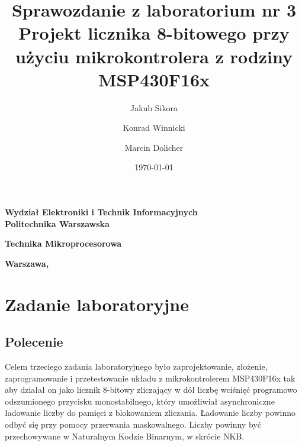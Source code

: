 \documentclass[a4paper,titlepage,11pt,floatssmall]{mwrep}
\title{\bf Sprawozdanie z laboratorium nr 3\\ Projekt licznika 8-bitowego przy użyciu mikrokontrolera z rodziny MSP430F16x  \vskip 0.1cm}
\author{Jakub Sikora \and Konrad Winnicki \and Marcin Dolicher}
\date{\today}
\begin{document}
\makeatletter
\renewcommand{\maketitle}{\begin{titlepage}
		\begin{center}{\LARGE {\bf
					Wydział Elektroniki i Technik Informacyjnych}}\\
			\vspace{0.4cm}
			{\LARGE {\bf Politechnika Warszawska}}\\
			\vspace{0.3cm}
		\end{center}
		\vspace{5cm}
		\begin{center}
			{\bf \LARGE Technika Mikroprocesorowa \vskip 0.1cm}
		\end{center}
		\vspace{1cm}
		\begin{center}
			{\bf \LARGE \@title}
		\end{center}
		\vspace{2cm}
		\begin{center}
			{\bf \Large \@author \par}
		\end{center}
		\vspace*{\stretch{6}}
		\begin{center}
			\bf{\large{Warszawa, \@date\vskip 0.1cm}}
		\end{center}
	\end{titlepage}
	}
\makeatother
\maketitle

\tableofcontents


\chapter{Zadanie laboratoryjne}
\section{Polecenie}
\indent{} Celem trzeciego zadania laboratoryjnego było zaprojektowanie, złożenie, zaprogramowanie i przetestowanie układu z mikrokontrolerem MSP430F16x tak aby działał on jako licznik 8-bitowy zliczający w dół liczbę wciśnięć programowo odszumionego przycisku monostabilnego, który umożliwiał asynchroniczne ładowanie liczby do pamięci z blokowaniem zliczania. Ładowanie liczby powinno odbyć się przy pomocy przerwania maskowalnego. Liczby powinny być przechowywane w Naturalnym Kodzie Binarnym, w skrócie NKB.
\end{document}
